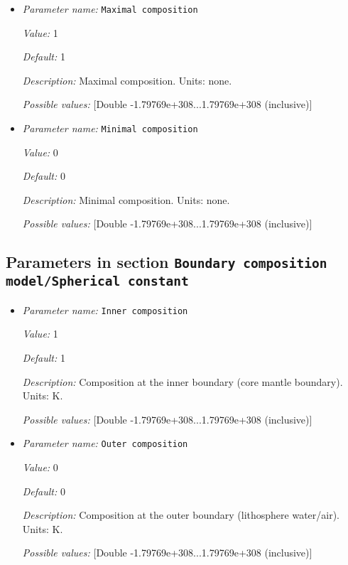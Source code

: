 \begin{itemize}
\item {\it Parameter name:} {\tt Maximal composition}


{\it Value:} 1


{\it Default:} 1


{\it Description:} Maximal composition. Units: none.


{\it Possible values:} [Double -1.79769e+308...1.79769e+308 (inclusive)]
\item {\it Parameter name:} {\tt Minimal composition}


{\it Value:} 0


{\it Default:} 0


{\it Description:} Minimal composition. Units: none.


{\it Possible values:} [Double -1.79769e+308...1.79769e+308 (inclusive)]
\end{itemize}

\subsection{Parameters in section \tt Boundary composition model/Spherical constant}
\label{parameters:Boundary_20composition_20model/Spherical_20constant}

\begin{itemize}
\item {\it Parameter name:} {\tt Inner composition}


{\it Value:} 1


{\it Default:} 1


{\it Description:} Composition at the inner boundary (core mantle boundary). Units: K.


{\it Possible values:} [Double -1.79769e+308...1.79769e+308 (inclusive)]
\item {\it Parameter name:} {\tt Outer composition}


{\it Value:} 0


{\it Default:} 0


{\it Description:} Composition at the outer boundary (lithosphere water/air). Units: K.


{\it Possible values:} [Double -1.79769e+308...1.79769e+308 (inclusive)]
\end{itemize}

